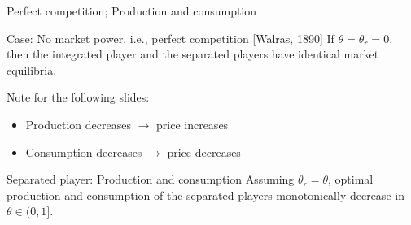 \documentclass[aspectratio=169,t]{beamer}  %
\begin{document}
\begin{frame}{Perfect competition; Production and consumption}

\begin{block}{Case: No market power, i.e., perfect competition [Walras, 1890]}
If $\theta=\theta_r=0$, then the integrated player and the separated players have identical market equilibria.
\end{block}
Note for the following slides:
\begin{itemize}
  \item Production decreases $\to$ price increases
  \item Consumption decreases $\to$ price decreases
\end{itemize}
\begin{block}{Separated player: Production and consumption}
Assuming $\theta_r=\theta$, optimal production and consumption of the separated players monotonically decrease in $\theta \in (0,1]$. 
\end{block}
\end{frame}
\end{document}
